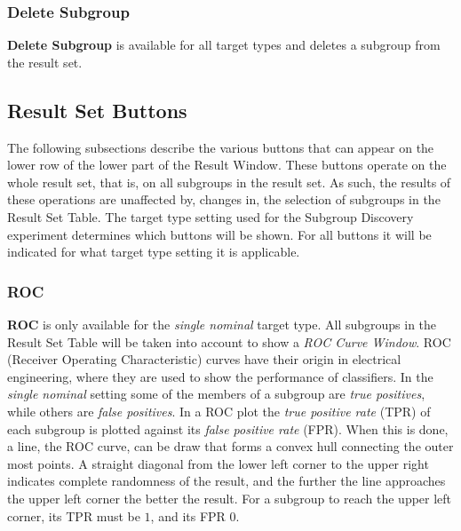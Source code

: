 \documentclass{article}
\begin{document}
\subsubsection{Delete Subgroup}
\label{result-window:delete}
\textbf{Delete Subgroup} is available for all target types and deletes a subgroup from the result set.



\subsection{Result Set Buttons}
\label{result-window:result-set-buttons}
The following subsections describe the various buttons that can appear on the lower row of the lower part of the Result Window.
These buttons operate on the whole result set, that is, on all subgroups in the result set.
As such, the results of these operations are unaffected by, changes in, the selection of subgroups in the Result Set Table.
The target type setting used for the Subgroup Discovery experiment determines which buttons will be shown.
For all buttons it will be indicated for what target type setting it is applicable.


\subsubsection{ROC}
\label{result-window:roc}
\textbf{ROC} is only available for the \emph{single nominal} target type.
All subgroups in the Result Set Table will be taken into account to show a \emph{ROC Curve Window}.
ROC (Receiver Operating Characteristic) curves have their origin in electrical engineering, where they are used to show the performance of classifiers.
In the \emph{single nominal} setting some of the members of a subgroup are \emph{true positives}, while others are \emph{false positives}.
In a ROC plot the \emph{true positive rate} (TPR) of each subgroup is plotted against its \emph{false positive rate} (FPR).
When this is done, a line, the ROC curve, can be draw that forms a convex hull connecting the outer most points.
A straight diagonal from the lower left corner to the upper right indicates complete randomness of the result, and the further the line approaches the upper left corner the better the result.
For a subgroup to reach the upper left corner, its TPR must be $1$, and its FPR $0$.
\end{document}
